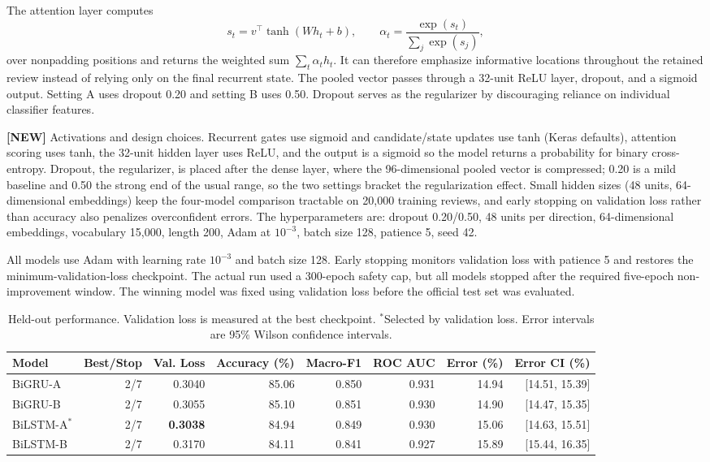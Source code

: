 \documentclass[conference]{IEEEtran}
\begin{document}
The attention layer computes
\begin{equation}
s_t=v^\top\tanh(Wh_t+b), \qquad
\alpha_t=\frac{\exp(s_t)}{\sum_j\exp(s_j)},
\end{equation}
over nonpadding positions and returns the weighted sum $\sum_t\alpha_t h_t$. It can therefore emphasize informative locations throughout the retained review instead of relying only on the final recurrent state. The pooled vector passes through a 32-unit ReLU layer, dropout, and a sigmoid output. Setting A uses dropout 0.20 and setting B uses 0.50. Dropout serves as the regularizer by discouraging reliance on individual classifier features.

\textbf{[NEW]} Activations and design choices. Recurrent gates use sigmoid and candidate/state updates use tanh (Keras defaults), attention scoring uses tanh, the 32-unit hidden layer uses ReLU, and the output is a sigmoid so the model returns a probability for binary cross-entropy. Dropout, the regularizer, is placed after the dense layer, where the 96-dimensional pooled vector is compressed; 0.20 is a mild baseline and 0.50 the strong end of the usual range, so the two settings bracket the regularization effect. Small hidden sizes (48 units, 64-dimensional embeddings) keep the four-model comparison tractable on 20,000 training reviews, and early stopping on validation loss rather than accuracy also penalizes overconfident errors. The hyperparameters are: dropout 0.20/0.50, 48 units per direction, 64-dimensional embeddings, vocabulary 15,000, length 200, Adam at $10^{-3}$, batch size 128, patience 5, seed 42.

All models use Adam with learning rate $10^{-3}$ and batch size 128. Early stopping monitors validation loss with patience 5 and restores the minimum-validation-loss checkpoint. The actual run used a 300-epoch safety cap, but all models stopped after the required five-epoch non-improvement window. The winning model was fixed using validation loss before the official test set was evaluated.

\begin{table}[!t]
\caption{Held-out performance. Validation loss is measured at the best checkpoint. $^\ast$Selected by validation loss. Error intervals are 95\% Wilson confidence intervals.}
\label{tab:results}
\centering
\small
\setlength{\tabcolsep}{4.2pt}
\begin{tabular}{lrrrrrrr}
\toprule
Model & Best/Stop & Val. Loss & Accuracy (\%) & Macro-F1 & ROC AUC & Error (\%) & Error CI (\%)\\
\midrule
BiGRU-A & 2/7 & 0.3040 & 85.06 & 0.850 & 0.931 & 14.94 & [14.51, 15.39]\\
BiGRU-B & 2/7 & 0.3055 & 85.10 & 0.851 & 0.930 & 14.90 & [14.47, 15.35]\\
BiLSTM-A$^\ast$ & 2/7 & \textbf{0.3038} & 84.94 & 0.849 & 0.930 & 15.06 & [14.63, 15.51]\\
BiLSTM-B & 2/7 & 0.3170 & 84.11 & 0.841 & 0.927 & 15.89 & [15.44, 16.35]\\
\bottomrule
\end{tabular}
\end{table}
\end{document}
